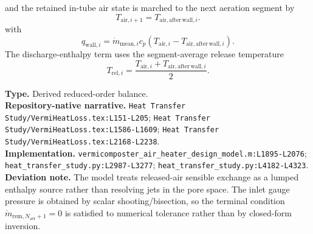 \documentclass[11pt]{article}
\newcommand{\srcref}[1]{\nolinkurl{#1}}
\newcommand{\filepath}[1]{\nolinkurl{#1}}
\begin{document}
and the retained in-tube air state is marched to the next aeration segment by
\begin{equation}
\label{eq:aeration_air_march}
T_{\mathrm{air},i+1}=T_{\mathrm{air,after\,wall},i}.
\end{equation}
with
\begin{equation}
\label{eq:cooling_q_wall_exact}
q_{\mathrm{wall},i}=\dot m_{\mathrm{mean},i}c_p\left(T_{\mathrm{air},i}-T_{\mathrm{air,after\,wall},i}\right).
\end{equation}
The discharge-enthalpy term uses the segment-average release temperature
\begin{equation}
\label{eq:release_temperature}
T_{\mathrm{rel},i}=\frac{T_{\mathrm{air},i}+T_{\mathrm{air,after\,wall},i}}{2}.
\end{equation}

\textbf{Type.} Derived reduced-order balance. \\
\textbf{Repository-native narrative.} \filepath{Heat Transfer Study/VermiHeatLoss.tex:L151-L205}; \filepath{Heat Transfer Study/VermiHeatLoss.tex:L1586-L1609}; \filepath{Heat Transfer Study/VermiHeatLoss.tex:L2168-L2238}. \\
\textbf{Implementation.} \srcref{vermicomposter_air_heater_design_model.m:L1895-L2076}; \srcref{heat_transfer_study.py:L2987-L3277}; \srcref{heat_transfer_study.py:L4182-L4323}. \\
\textbf{Deviation note.} The model treats released-air sensible exchange as a lumped enthalpy source rather than resolving jets in the pore space. The inlet gauge pressure is obtained by scalar shooting/bisection, so the terminal condition \(\dot m_{\mathrm{rem},N_{\mathrm{aer}}+1}=0\) is satisfied to numerical tolerance rather than by closed-form inversion.
\end{document}
